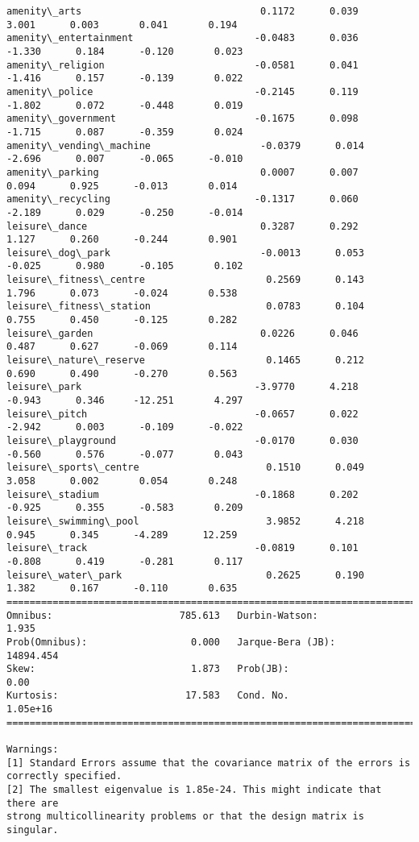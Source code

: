 \documentclass[11pt]{article}
\begin{document}
\begin{Verbatim}[commandchars=\\\{\}]
amenity\_arts                               0.1172      0.039      3.001      0.003       0.041       0.194
amenity\_entertainment                     -0.0483      0.036     -1.330      0.184      -0.120       0.023
amenity\_religion                          -0.0581      0.041     -1.416      0.157      -0.139       0.022
amenity\_police                            -0.2145      0.119     -1.802      0.072      -0.448       0.019
amenity\_government                        -0.1675      0.098     -1.715      0.087      -0.359       0.024
amenity\_vending\_machine                   -0.0379      0.014     -2.696      0.007      -0.065      -0.010
amenity\_parking                            0.0007      0.007      0.094      0.925      -0.013       0.014
amenity\_recycling                         -0.1317      0.060     -2.189      0.029      -0.250      -0.014
leisure\_dance                              0.3287      0.292      1.127      0.260      -0.244       0.901
leisure\_dog\_park                          -0.0013      0.053     -0.025      0.980      -0.105       0.102
leisure\_fitness\_centre                     0.2569      0.143      1.796      0.073      -0.024       0.538
leisure\_fitness\_station                    0.0783      0.104      0.755      0.450      -0.125       0.282
leisure\_garden                             0.0226      0.046      0.487      0.627      -0.069       0.114
leisure\_nature\_reserve                     0.1465      0.212      0.690      0.490      -0.270       0.563
leisure\_park                              -3.9770      4.218     -0.943      0.346     -12.251       4.297
leisure\_pitch                             -0.0657      0.022     -2.942      0.003      -0.109      -0.022
leisure\_playground                        -0.0170      0.030     -0.560      0.576      -0.077       0.043
leisure\_sports\_centre                      0.1510      0.049      3.058      0.002       0.054       0.248
leisure\_stadium                           -0.1868      0.202     -0.925      0.355      -0.583       0.209
leisure\_swimming\_pool                      3.9852      4.218      0.945      0.345      -4.289      12.259
leisure\_track                             -0.0819      0.101     -0.808      0.419      -0.281       0.117
leisure\_water\_park                         0.2625      0.190      1.382      0.167      -0.110       0.635
==============================================================================
Omnibus:                      785.613   Durbin-Watson:                   1.935
Prob(Omnibus):                  0.000   Jarque-Bera (JB):            14894.454
Skew:                           1.873   Prob(JB):                         0.00
Kurtosis:                      17.583   Cond. No.                     1.05e+16
==============================================================================

Warnings:
[1] Standard Errors assume that the covariance matrix of the errors is correctly specified.
[2] The smallest eigenvalue is 1.85e-24. This might indicate that there are
strong multicollinearity problems or that the design matrix is singular.

    \end{Verbatim}
\end{document}
